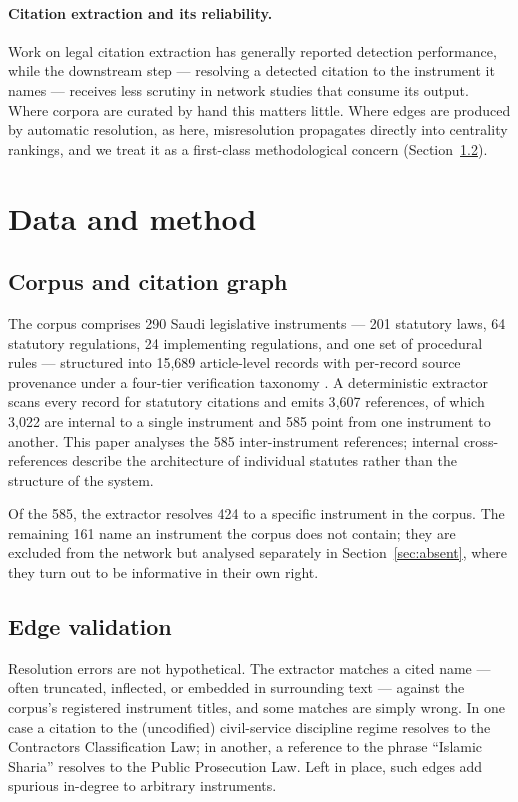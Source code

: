 \documentclass[sn-basic]{sn-jnl}%
\newcommand{\corpuscite}{anon2026corpus}
\newcommand{\corpuscite}{almohammedi2026corpus}
\begin{document}
\paragraph{Citation extraction and its reliability.}
Work on legal citation extraction has generally reported detection
performance, while the downstream step --- resolving a detected citation to
the instrument it names --- receives less scrutiny in network studies that
consume its output. Where corpora are curated by hand this matters little.
Where edges are produced by automatic resolution, as here, misresolution
propagates directly into centrality rankings, and we treat it as a first-class
methodological concern (Section~\ref{sec:validation}).

\section{Data and method}
\label{sec:method}

\subsection{Corpus and citation graph}

The corpus comprises 290 Saudi legislative instruments --- 201 statutory
laws, 64 statutory regulations, 24 implementing regulations, and one set of
procedural rules --- structured into 15{,}689 article-level records with
per-record source provenance under a four-tier verification taxonomy
\citep{\corpuscite}. A deterministic extractor scans every record
for statutory citations and emits 3{,}607 references, of which 3{,}022 are
internal to a single instrument and 585 point from one instrument to
another. This paper analyses the 585 inter-instrument references; internal
cross-references describe the architecture of individual statutes rather
than the structure of the system.

Of the 585, the extractor resolves 424 to a specific instrument in the
corpus. The remaining 161 name an instrument the corpus does not contain;
they are excluded from the network but analysed separately in
Section~\ref{sec:absent}, where they turn out to be informative in their own
right.

\subsection{Edge validation}
\label{sec:validation}

Resolution errors are not hypothetical. The extractor matches a cited name
--- often truncated, inflected, or embedded in surrounding text --- against
the corpus's registered instrument titles, and some matches are simply
wrong. In one case a citation to the (uncodified) civil-service discipline
regime resolves to the Contractors Classification Law; in another, a
reference to the phrase ``Islamic Sharia'' resolves to the Public
Prosecution Law. Left in place, such edges add spurious in-degree to
arbitrary instruments.
\end{document}
